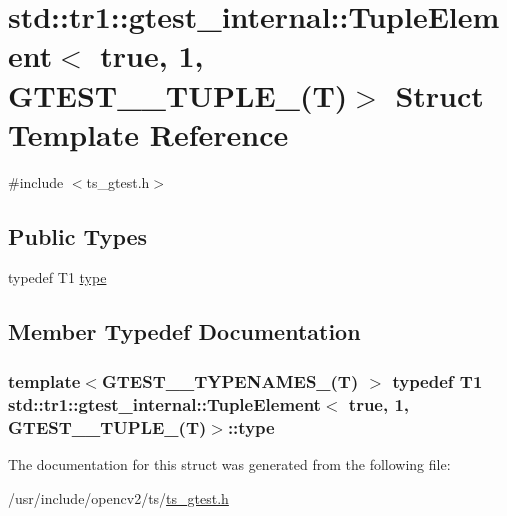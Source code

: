 \hypertarget{structstd_1_1tr1_1_1gtest__internal_1_1TupleElement_3_01true_00_011_00_01GTEST__10__TUPLE___07T_08_4}{\section{std\-:\-:tr1\-:\-:gtest\-\_\-internal\-:\-:Tuple\-Element$<$ true, 1, G\-T\-E\-S\-T\-\_\-\_\-\-T\-U\-P\-L\-E\-\_\-(T)$>$ Struct Template Reference}
\label{structstd_1_1tr1_1_1gtest__internal_1_1TupleElement_3_01true_00_011_00_01GTEST__10__TUPLE___07T_08_4}
}


{\ttfamily \#include $<$ts\-\_\-gtest.\-h$>$}

\subsection*{Public Types}
\begin{DoxyCompactItemize}
\item 
typedef T1 \hyperlink{structstd_1_1tr1_1_1gtest__internal_1_1TupleElement_3_01true_00_011_00_01GTEST__10__TUPLE___07T_08_4_a24297d5bdeab5d8a1d708181d0a9352f}{type}
\end{DoxyCompactItemize}


\subsection{Member Typedef Documentation}
\hypertarget{structstd_1_1tr1_1_1gtest__internal_1_1TupleElement_3_01true_00_011_00_01GTEST__10__TUPLE___07T_08_4_a24297d5bdeab5d8a1d708181d0a9352f}{
\subsubsection[{type}]{\setlength{\rightskip}{0pt plus 5cm}template$<$G\-T\-E\-S\-T\-\_\-\_\-\-T\-Y\-P\-E\-N\-A\-M\-E\-S\-\_\-(\-T) $>$ typedef T1 {\bf std\-::tr1\-::gtest\-\_\-internal\-::\-Tuple\-Element}$<$ true, 1, {\bf G\-T\-E\-S\-T\-\_\-\_\-\-T\-U\-P\-L\-E\-\_\-}({\bf T})$>$\-::{\bf type}}}\label{structstd_1_1tr1_1_1gtest__internal_1_1TupleElement_3_01true_00_011_00_01GTEST__10__TUPLE___07T_08_4_a24297d5bdeab5d8a1d708181d0a9352f}


The documentation for this struct was generated from the following file\-:\begin{DoxyCompactItemize}
\item 
/usr/include/opencv2/ts/\hyperlink{ts__gtest_8h}{ts\-\_\-gtest.\-h}\end{DoxyCompactItemize}
